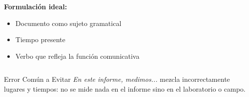 \documentclass{beamer}
\begin{document}
\begin{frame}
\begin{columns}[T]
\begin{column}{0.48\textwidth}
\vspace{0.1cm}
\textbf{Formulación ideal:}
\begin{itemize}
    \item Documento como sujeto gramatical
    \item Tiempo presente
    \item Verbo que refleja la función comunicativa
\end{itemize}
\end{column}
\end{columns}

\vspace{0.3cm}
\begin{block}{Error Común a Evitar}
\textit{En este informe, medimos...} mezcla incorrectamente lugares y tiempos: no se mide nada en el informe sino en el laboratorio o campo.
\end{block}
\end{frame}
\end{document}
